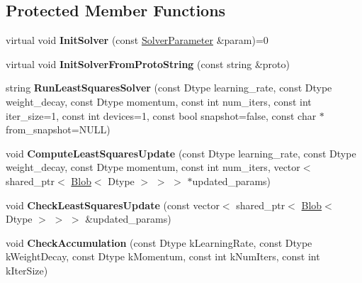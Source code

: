 \subsection*{Protected Member Functions}
\begin{DoxyCompactItemize}
\item 
\mbox{\label{classcaffe_1_1_gradient_based_solver_test_a4bec85e24cc8c2803b5d85ed424e4b84}} 
virtual void {\bfseries Init\+Solver} (const \mbox{\hyperlink{classcaffe_1_1_solver_parameter}{Solver\+Parameter}} \&param)=0
\item 
\mbox{\label{classcaffe_1_1_gradient_based_solver_test_ae770f26cc56cd77771209e3b333c8b5d}} 
virtual void {\bfseries Init\+Solver\+From\+Proto\+String} (const string \&proto)
\item 
\mbox{\label{classcaffe_1_1_gradient_based_solver_test_a25e92cac3dff8b359ea16ef29ec05013}} 
string {\bfseries Run\+Least\+Squares\+Solver} (const Dtype learning\+\_\+rate, const Dtype weight\+\_\+decay, const Dtype momentum, const int num\+\_\+iters, const int iter\+\_\+size=1, const int devices=1, const bool snapshot=false, const char $\ast$from\+\_\+snapshot=N\+U\+LL)
\item 
\mbox{\label{classcaffe_1_1_gradient_based_solver_test_ac578855938156dd5287abfcd16c323b2}} 
void {\bfseries Compute\+Least\+Squares\+Update} (const Dtype learning\+\_\+rate, const Dtype weight\+\_\+decay, const Dtype momentum, const int num\+\_\+iters, vector$<$ shared\+\_\+ptr$<$ \mbox{\hyperlink{classcaffe_1_1_blob}{Blob}}$<$ Dtype $>$ $>$ $>$ $\ast$updated\+\_\+params)
\item 
\mbox{\label{classcaffe_1_1_gradient_based_solver_test_a86b866f20fb6fcf8118b9bf668d8ef38}} 
void {\bfseries Check\+Least\+Squares\+Update} (const vector$<$ shared\+\_\+ptr$<$ \mbox{\hyperlink{classcaffe_1_1_blob}{Blob}}$<$ Dtype $>$ $>$ $>$ \&updated\+\_\+params)
\item 
\mbox{\label{classcaffe_1_1_gradient_based_solver_test_a88e6a5c3d61c996a560017235b1ac725}} 
void {\bfseries Check\+Accumulation} (const Dtype k\+Learning\+Rate, const Dtype k\+Weight\+Decay, const Dtype k\+Momentum, const int k\+Num\+Iters, const int k\+Iter\+Size)

\end{DoxyCompactItemize}
